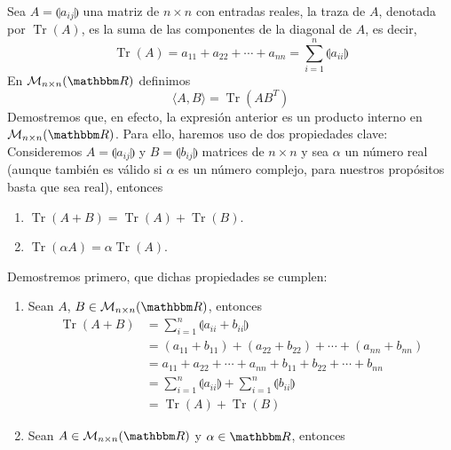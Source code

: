 \newpage

\begin{example}
    Sea $A = \llparenthesis a_{i j} \rrparenthesis$ una matriz de $n \times n$ con entradas reales, la traza de $A$, denotada por $\operatorname{Tr}(A)$, es la suma de las componentes de la diagonal de $A$, es decir,
    $$\operatorname{Tr}(A) = a_{11} + a_{22} + \cdots + a_{nn} = \sum_{i=1}^n \llparenthesis a_{ii} \rrparenthesis$$
    En $\mathcal{M}_{n \times n}(\RR)$ definimos
    \begin{equation}
        \langle A, B \rangle = \operatorname{Tr}\left(A B^{T}\right) \label{usual_matrices}
    \end{equation}
    Demostremos que, en efecto, la expresión anterior es un producto interno en $\mathcal{M}_{n \times n}(\RR)$. Para ello, haremos uso de dos propiedades clave: Consideremos $A = \llparenthesis a_{i j} \rrparenthesis$ y $B = \llparenthesis b_{i j} \rrparenthesis$ matrices de $n \times n$ y sea $\alpha$ un número real (aunque también es válido si $\alpha$ es un número complejo, para nuestros propósitos basta que sea real), entonces
    \begin{enumerate}[label=\Roman*)]
        \item $\operatorname{Tr}(A + B) = \operatorname{Tr}(A) + \operatorname{Tr}(B)$.
        \item $\operatorname{Tr}(\alpha A) = \alpha \operatorname{Tr}(A)$.
    \end{enumerate}
    Demostremos primero, que dichas propiedades se cumplen:
    \begin{enumerate}[label=\Roman*)]
        \item Sean $A$, $B \in \mathcal{M}_{n \times n}(\RR)$, entonces
        \begin{align*}
            \operatorname{Tr}(A + B) & = \sum_{i=1}^n \llparenthesis a_{ii} + b_{ii} \rrparenthesis \\
            & = (a_{11} + b_{11}) + (a_{22} + b_{22}) + \cdots + (a_{nn} + b_{nn}) \\
            & = a_{11} + a_{22} + \cdots + a_{nn} + b_{11} + b_{22} + \cdots + b_{nn} \\
            & = \sum_{i=1}^n \llparenthesis a_{ii} \rrparenthesis + \sum_{i=1}^n \llparenthesis b_{ii} \rrparenthesis \\
            & = \operatorname{Tr}(A) + \operatorname{Tr}(B)
        \end{align*}
        \item Sean $A \in \mathcal{M}_{n \times n}(\RR)$ y $\alpha \in \RR$, entonces

\end{enumerate}
\end{example}
